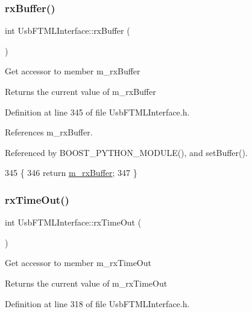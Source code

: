 \subsubsection{\texorpdfstring{rx\+Buffer()}{rxBuffer()}}
{\footnotesize\ttfamily int Usb\+F\+T\+M\+L\+Interface\+::rx\+Buffer (\begin{DoxyParamCaption}{ }\end{DoxyParamCaption})\hspace{0.3cm}{\ttfamily [inline]}}

Get accessor to member m\+\_\+rx\+Buffer \begin{DoxyReturn}{Returns}
the current value of m\+\_\+rx\+Buffer 
\end{DoxyReturn}


Definition at line 345 of file Usb\+F\+T\+M\+L\+Interface.\+h.



References m\+\_\+rx\+Buffer.



Referenced by B\+O\+O\+S\+T\+\_\+\+P\+Y\+T\+H\+O\+N\+\_\+\+M\+O\+D\+U\+L\+E(), and set\+Buffer().


\begin{DoxyCode}
345                   \{
346     \textcolor{keywordflow}{return} \hyperlink{classUsbFTMLInterface_a8f0f8bb2a4fe14ca4890695f41fbcbf8}{m\_rxBuffer};
347   \}
\end{DoxyCode}
\mbox{\label{classUsbFTMLInterface_a106df14066462a38f7e4849c9d15828a}} 
\subsubsection{\texorpdfstring{rx\+Time\+Out()}{rxTimeOut()}}
{\footnotesize\ttfamily int Usb\+F\+T\+M\+L\+Interface\+::rx\+Time\+Out (\begin{DoxyParamCaption}{ }\end{DoxyParamCaption})\hspace{0.3cm}{\ttfamily [inline]}}

Get accessor to member m\+\_\+rx\+Time\+Out \begin{DoxyReturn}{Returns}
the current value of m\+\_\+rx\+Time\+Out 
\end{DoxyReturn}


Definition at line 318 of file Usb\+F\+T\+M\+L\+Interface.\+h.



